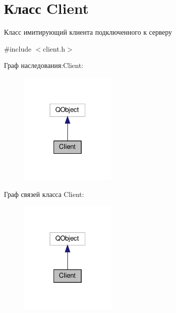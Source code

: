 \hypertarget{classClient}{}\section{Класс Client}
\label{classClient}


Класс имитирующий клиента подключенного к серверу  




{\ttfamily \#include $<$client.\+h$>$}



Граф наследования\+:Client\+:\nopagebreak
\begin{figure}[H]
\begin{center}
\leavevmode
\includegraphics[width=133pt]{classClient__inherit__graph}
\end{center}
\end{figure}


Граф связей класса Client\+:\nopagebreak
\begin{figure}[H]
\begin{center}
\leavevmode
\includegraphics[width=133pt]{classClient__coll__graph}
\end{center}
\end{figure}
